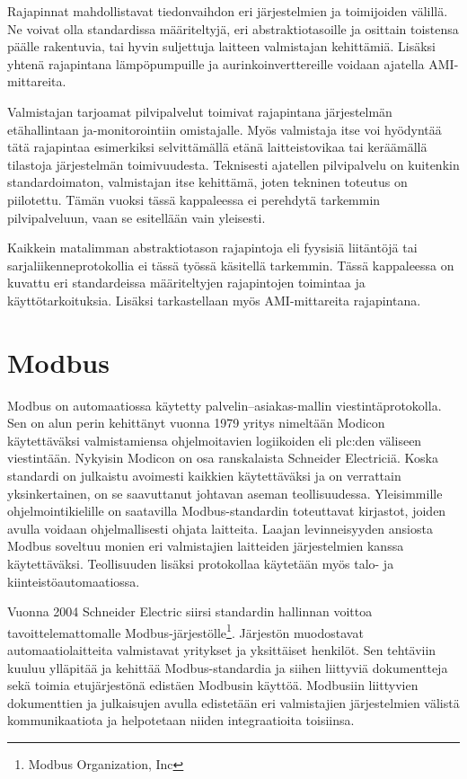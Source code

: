 Rajapinnat mahdollistavat tiedonvaihdon eri järjestelmien ja toimijoiden välillä. Ne voivat olla standardissa määriteltyjä, eri abstraktiotasoille ja osittain toistensa päälle rakentuvia, tai hyvin suljettuja laitteen valmistajan kehittämiä. Lisäksi yhtenä rajapintana lämpöpumpuille ja aurinkoinverttereille voidaan ajatella AMI-mittareita.

Valmistajan tarjoamat pilvipalvelut toimivat rajapintana järjestelmän etähallintaan ja\linebreak -monitorointiin omistajalle. Myös valmistaja itse voi hyödyntää tätä rajapintaa esimerkiksi selvittämällä etänä laitteistovikaa tai keräämällä tilastoja järjestelmän toimivuudesta. Teknisesti ajatellen pilvipalvelu on kuitenkin standardoimaton, valmistajan itse kehittämä, joten tekninen toteutus on piilotettu. Tämän vuoksi tässä kappaleessa ei perehdytä tarkemmin pilvipalveluun, vaan se esitellään vain yleisesti.

Kaikkein matalimman abstraktiotason rajapintoja eli fyysisiä liitäntöjä tai sarjaliikenneprotokollia ei tässä työssä käsitellä tarkemmin. Tässä kappaleessa on kuvattu eri standardeissa määriteltyjen rajapintojen toimintaa ja käyttötarkoituksia. Lisäksi tarkastellaan myös \gls{AMI}-mittareita rajapintana.

\section{Modbus}

  Modbus on automaatiossa käytetty palvelin--asiakas-mallin viestintäprotokolla. Sen on alun perin kehittänyt vuonna 1979 yritys nimeltään Modicon käytettäväksi valmistamiensa ohjelmoitavien logiikoiden eli \Gls{plc}:den väliseen viestintään. Nykyisin Modicon on osa ranskalaista Schneider Electriciä. Koska standardi on julkaistu avoimesti kaikkien käytettäväksi ja on verrattain yksinkertainen, on se saavuttanut johtavan aseman teollisuudessa. Yleisimmille ohjelmointikielille on saatavilla Modbus-standardin toteuttavat kirjastot, joiden avulla voidaan ohjelmallisesti ohjata laitteita. Laajan levinneisyyden ansiosta Modbus soveltuu monien eri valmistajien laitteiden järjestelmien kanssa käytettäväksi. Teollisuuden lisäksi protokollaa käytetään myös talo- ja kiinteistöautomaatiossa. \mbox{\parencite{sousaPortugal, modbusAppSpec, modbusOrg}}

  Vuonna 2004 Schneider Electric siirsi standardin hallinnan voittoa tavoittelemattomalle Modbus-järjestölle\footnote{Modbus Organization, Inc}. Järjestön muodostavat automaatiolaitteita valmistavat yritykset ja yksittäiset henkilöt. Sen tehtäviin kuuluu ylläpitää ja kehittää Modbus-standardia ja siihen liittyviä dokumentteja sekä toimia etujärjestönä edistäen Modbusin käyttöä. Modbusiin liittyvien dokumenttien ja julkaisujen avulla edistetään eri valmistajien järjestelmien välistä kommunikaatiota ja helpotetaan niiden integraatioita toisiinsa. \parencite{modbusOrg}

